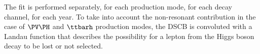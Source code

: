 The fit is performed separately, for each production mode, for each decay channel, for each year. 
To take into account the non-resonant contribution in the case of $\PV\PH$ and $\ttbarh$ production modes, the 
DSCB is convoluted with a Landau function that describes the possibility for a 
lepton from the Higgs boson decay to be lost or not selected.\\
